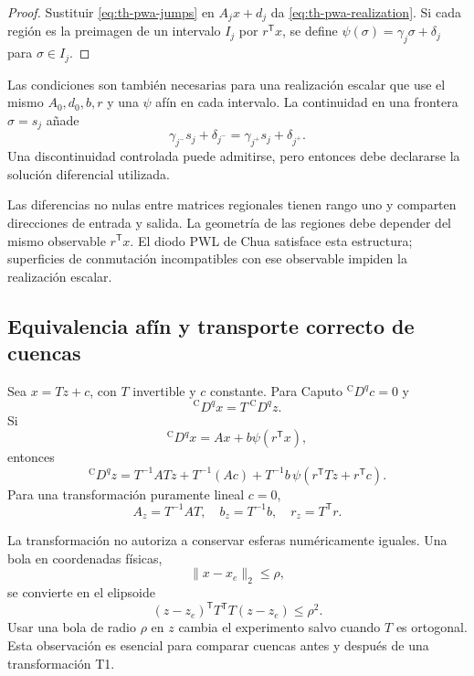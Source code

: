 \begin{proof}
Sustituir \cref{eq:th-pwa-jumps} en
\(A_jx+d_j\) da \cref{eq:th-pwa-realization}. Si cada región es la preimagen
de un intervalo \(I_j\) por \(r^{\mathsf T}x\), se define
\(\psi(\sigma)=\gamma_j\sigma+\delta_j\) para \(\sigma\in I_j\).
\end{proof}

Las condiciones son también necesarias para una realización escalar que use
el mismo \(A_0,d_0,b,r\) y una \(\psi\) afín en cada intervalo. La continuidad
en una frontera \(\sigma=s_j\) añade
\[
 \gamma_{j^-}s_j+\delta_{j^-}
 =\gamma_{j^+}s_j+\delta_{j^+}.
\]
Una discontinuidad controlada puede admitirse, pero entonces debe declararse
la solución diferencial utilizada.

Las diferencias no nulas entre matrices regionales tienen
rango uno y comparten direcciones de entrada y salida. La geometría de las
regiones debe depender del mismo observable \(r^{\mathsf T}x\). El diodo
PWL de Chua satisface esta estructura; superficies de conmutación incompatibles
con ese observable impiden la realización escalar.

\subsection{Equivalencia afín y transporte correcto de cuencas}
\label{sec:affine-caputo}

Sea \(x=Tz+c\), con \(T\) invertible y \(c\) constante. Para Caputo
\({}^{\mathrm C}D^q c=0\) y
\[
 {}^{\mathrm C}D^q x=T\,{}^{\mathrm C}D^q z.
\]
Si
\[
 {}^{\mathrm C}D^q x=Ax+b\psi(r^{\mathsf T}x),
\]
entonces
\begin{equation}
 {}^{\mathrm C}D^q z
 =T^{-1}ATz+T^{-1}(Ac)
 +T^{-1}b\,
 \psi\!\left(r^{\mathsf T}Tz+r^{\mathsf T}c\right).
 \label{eq:th-affine-caputo}
\end{equation}
Para una transformación puramente lineal \(c=0\),
\[
 A_z=T^{-1}AT,\quad b_z=T^{-1}b,\quad r_z=T^{\mathsf T}r.
\]

La transformación no autoriza a conservar esferas numéricamente iguales. Una
bola en coordenadas físicas,
\[
 \|x-x_e\|_2\leq\rho,
\]
se convierte en el elipsoide
\begin{equation}
 (z-z_e)^{\mathsf T}T^{\mathsf T}T(z-z_e)\leq\rho^2.
 \label{eq:th-ellipsoid}
\end{equation}
Usar una bola de radio \(\rho\) en \(z\) cambia el experimento salvo cuando
\(T\) es ortogonal. Esta observación es esencial para comparar cuencas antes y
después de una transformación T1.

